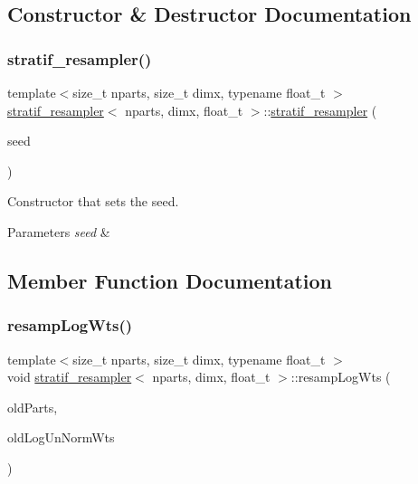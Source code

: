 \subsection{Constructor \& Destructor Documentation}
\mbox{\label{classstratif__resampler_acb18d2ea4d0c2025c2bdb58c3b6ddf4b}} 
\subsubsection{\texorpdfstring{stratif\+\_\+resampler()}{stratif\_resampler()}}
{\footnotesize\ttfamily template$<$size\+\_\+t nparts, size\+\_\+t dimx, typename float\+\_\+t $>$ \\
\hyperlink{classstratif__resampler}{stratif\+\_\+resampler}$<$ nparts, dimx, float\+\_\+t $>$\+::\hyperlink{classstratif__resampler}{stratif\+\_\+resampler} (\begin{DoxyParamCaption}\item[{unsigned long}]{seed }\end{DoxyParamCaption})}



Constructor that sets the seed. 


\begin{DoxyParams}{Parameters}
{\em seed} & \\
\hline
\end{DoxyParams}


\subsection{Member Function Documentation}
\mbox{\label{classstratif__resampler_a2588147563bf3fe598e262cae7e125e6}} 
\subsubsection{\texorpdfstring{resamp\+Log\+Wts()}{resampLogWts()}}
{\footnotesize\ttfamily template$<$size\+\_\+t nparts, size\+\_\+t dimx, typename float\+\_\+t $>$ \\
void \hyperlink{classstratif__resampler}{stratif\+\_\+resampler}$<$ nparts, dimx, float\+\_\+t $>$\+::resamp\+Log\+Wts (\begin{DoxyParamCaption}\item[{\hyperlink{classrbase_aa12fc826befa6ba0647b5f59ebc396ee}{array\+Vec} \&}]{old\+Parts,  }\item[{\hyperlink{classrbase_a6f76bef853e508cb5b6f546d231b06f5}{array\+Float} \&}]{old\+Log\+Un\+Norm\+Wts }\end{DoxyParamCaption})\hspace{0.3cm}{\ttfamily [virtual]}}



